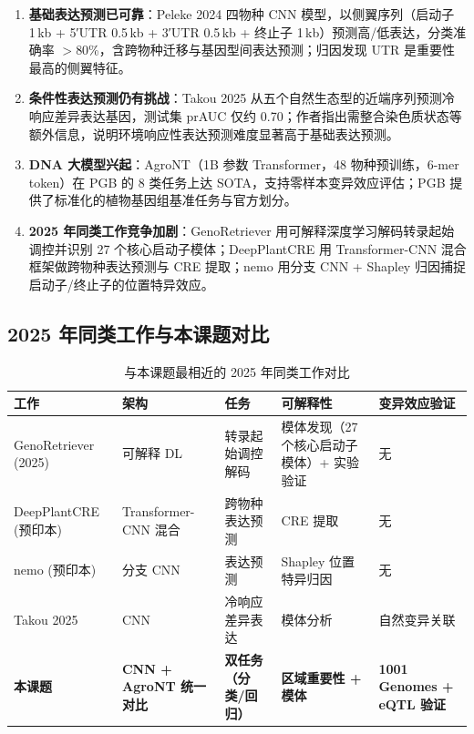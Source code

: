 \documentclass[UTF8,11pt,a4paper]{ctexart}
\begin{document}
\begin{enumerate}
\item \textbf{基础表达预测已可靠}：Peleke 2024 四物种 CNN 模型，以侧翼序列（启动子 1\,kb + 5′UTR 0.5\,kb + 3′UTR 0.5\,kb + 终止子 1\,kb）预测高/低表达，分类准确率 $>$80\%，含跨物种迁移与基因型间表达预测；归因发现 UTR 是重要性最高的侧翼特征\cite{peleke2024}。
\item \textbf{条件性表达预测仍有挑战}：Takou 2025 从五个自然生态型的近端序列预测冷响应差异表达基因，测试集 prAUC 仅约 0.70；作者指出需整合染色质状态等额外信息，说明环境响应性表达预测难度显著高于基础表达预测\cite{takou2025}。
\item \textbf{DNA 大模型兴起}：AgroNT（1B 参数 Transformer，48 物种预训练，6-mer token）在 PGB 的 8 类任务上达 SOTA，支持零样本变异效应评估\cite{mendoza2024}；PGB 提供了标准化的植物基因组基准任务与官方划分\cite{pgb2024}。
\item \textbf{2025 年同类工作竞争加剧}：GenoRetriever 用可解释深度学习解码转录起始调控并识别 27 个核心启动子模体\cite{genoretriever2025}；DeepPlantCRE 用 Transformer-CNN 混合框架做跨物种表达预测与 CRE 提取\cite{deepcre2025}；nemo 用分支 CNN + Shapley 归因捕捉启动子/终止子的位置特异效应\cite{nemo2025}。
\end{enumerate}

\subsection{2025 年同类工作与本课题对比}
\label{sec:survey-compare}

\begin{table}[htbp]
\centering
\caption{与本课题最相近的 2025 年同类工作对比}
\label{tab:competitors}
\small
\begin{tabular}{@{}p{2.4cm}p{2.8cm}p{2.9cm}p{2.9cm}p{3.2cm}@{}}
\toprule
\textbf{工作} & \textbf{架构} & \textbf{任务} & \textbf{可解释性} & \textbf{变异效应验证} \\
\midrule
GenoRetriever (2025) & 可解释 DL & 转录起始调控解码 & 模体发现（27 个核心启动子模体）+ 实验验证 & 无 \\
DeepPlantCRE (预印本) & Transformer-CNN 混合 & 跨物种表达预测 & CRE 提取 & 无 \\
nemo (预印本) & 分支 CNN & 表达预测 & Shapley 位置特异归因 & 无 \\
Takou 2025 & CNN & 冷响应差异表达 & 模体分析 & 自然变异关联 \\
\midrule
\textbf{本课题} & \textbf{CNN + AgroNT 统一对比} & \textbf{双任务（分类/回归）} & \textbf{区域重要性 + 模体} & \textbf{1001 Genomes + eQTL 验证} \\
\bottomrule
\end{tabular}
\end{table}
\end{document}

